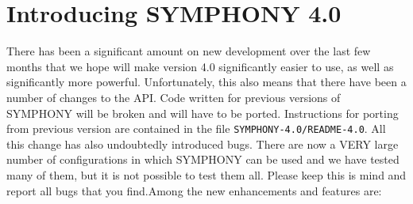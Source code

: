 \section{Introducing SYMPHONY 4.0}
\label{whats-new}

There has been a significant amount on new development over the last few
months that we hope will make version 4.0 significantly easier to use, as well
as significantly more powerful. Unfortunately, this also means that there have
been a number of changes to the API. Code written for previous versions of
SYMPHONY will be broken and will have to be ported. Instructions for porting
from previous version are contained in the file
\texttt{SYMPHONY-4.0/README-4.0}. All this change has also
undoubtedly introduced bugs. There are now a VERY large number of
configurations in which SYMPHONY can be used and we have tested many of them,
but it is not possible to test them all. Please keep this is mind and report
all bugs that you find.Among the new enhancements and features are:

